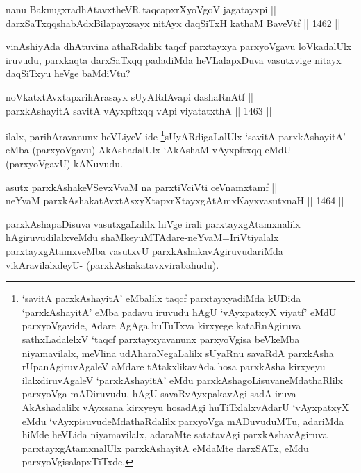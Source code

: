 
\begin{shl}
nanu BaknugxradhAtavxtheVR taqcapxrXyoVgoV jagatayxpi || \\
darxSaTxqqshabAdxBilapayxsayx nitAyx daqSiTxH kathaM BaveVtf \hfill || 1462 ||  
\end{shl}

\begin{artha}
vinAshiyAda dhAtuvina athaRdalilx taqcf parxtayxya parxyoVgavu loVkadalUlx iruvudu, parxkaqta darxSaTxqq padadiMda heVLalapxDuva vasutxvige nitayx daqSiTxyu heVge baMdiVtu?
\end{artha}


\begin{shl}
noVkatxtAvxtapxrihArasayx sUyARdAvapi dashaRnAtf || \\
parxkAshayitA savitA vAyxpftxqq vA\s pi viyatatxthA \hfill || 1463 ||  
\end{shl}

\begin{artha}
ilalx, parihAravanunx heVLiyeV ide \footnote{`savitA parxkAshayitA' eMbalilx taqcf parxtayxyadiMda kUDida `parxkAshayitA' eMba padavu iruvudu hAgU `vAyxpatxyX viyatf' eMdU parxyoVgavide, Adare AgAga huTuTxva kirxyege kataRnAgiruva sathxLadalelxV `taqcf parxtayxyavanunx parxyoVgisa beVkeMba niyamavilalx, meVlina udAharaNegaLalilx sUyaRnu savaRdA parxkAsha rUpanAgiruvAgaleV aMdare tAtakxlikavAda hosa parxkAsha kirxyeyu ilalxdiruvAgaleV `parxkAshayitA' eMdu parxkAshagoLisuvaneMdathaRlilx parxyoVga mADiruvudu, hAgU savaRvAyxpakavAgi sadA iruva AkAshadalilx vAyxsana kirxyeyu hosadAgi huTiTxlalxvAdarU `vAyxpatxyX eMdu `vAyxpisuvudeMdathaRdalilx parxyoVga mADuvuduMTu, adariMda hiMde heVLida niyamavilalx, adaraMte satatavAgi parxkAshavAgiruva parxtayxgAtamxnalUlx parxkAshayitA eMdaMte darxSATx, eMdu parxyoVgisalapxTiTxde.}sUyARdigaLalUlx `savitA parxkAshayitA' eMba (parxyoVgavu) AkAshadalUlx `AkAshaM vAyxpftxqq eMdU (parxyoVgavU) kANuvudu.
\end{artha}


\begin{shl}
asutx parxkAshakeVSevxVvaM na parxtiVciVti ceVnamxtamf || \\
neYvaM parxkAshakatAvxtAsxyXtapxrXtayxgAtAmxKayxvasutxnaH \hfill || 1464 ||  
\end{shl}

\begin{artha}
parxkAshapaDisuva vasutxgaLalilx hiVge irali parxtayxgAtamxnalilx hAgiruvudilalxveMdu shaMkeyuMTAdare-neYvaM=IriVtiyalalx parxtayxgAtamxveMba vasutxvU parxkAshakavAgiruvudariMda vikAravilalxdeyU- (parxkAshakatavxvirabahudu).
\end{artha}

